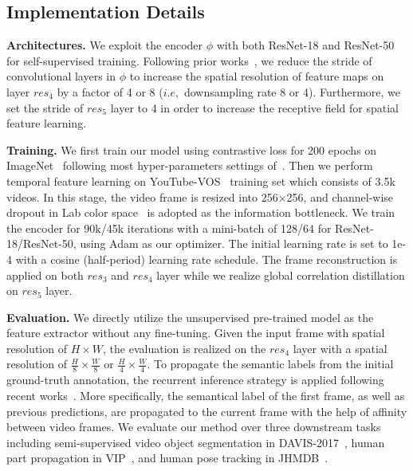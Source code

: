 \documentclass{article}
\begin{document}
\subsection{Implementation Details}
\textbf{Architectures.} We exploit the encoder $\phi$ with both ResNet-18 and ResNet-50~\cite{he2016deep} for self-supervised training. Following prior works~\cite{jabri2020space}\cite{lai2020mast}\cite{xu2021rethinking}, we reduce the stride of convolutional layers in $\phi$ to increase the spatial resolution of feature maps on layer $res_4$  by a factor of 4 or 8 ($i.e,$ downsampling rate 8 or 4). 
Furthermore, we set the stride of $res_5$ layer to 4 in order to increase the receptive field for spatial feature learning.

\textbf{Training.}
We first train our model using contrastive loss for 200 epochs on ImageNet~\cite{deng2009large} following most hyper-parameters settings of~\cite{he2020momentum}. Then we perform temporal feature learning on YouTube-VOS~\cite{xu2018youtube} training set which consists of 3.5k videos. In this stage, the video frame is resized into 256$\times$256, and channel-wise dropout in Lab color space~\cite{lai2019self}\cite{lai2020mast} is adopted as the information bottleneck. We train the encoder for 90k/45k iterations with a mini-batch of 128/64 for ResNet-18/ResNet-50,  using Adam as our optimizer. The initial learning rate is set to 1e-4 with a cosine (half-period) learning rate schedule. The frame reconstruction is applied on both $res_3$ and $res_4$ layer while we realize global correlation distillation on $res_5$ layer.

\textbf{Evaluation.}
 We directly utilize the unsupervised pre-trained model as the feature extractor without any fine-tuning. Given the input frame with  spatial resolution of $H\times W$, the evaluation is realized on the $res_4$ layer with a spatial resolution of $\frac{H}{8} \times \frac{W}{8}$ or $\frac{H}{4} \times \frac{W}{4}$. To propagate the semantic labels from the initial ground-truth annotation, the recurrent inference strategy is applied following recent works~\cite{jabri2020space}\cite{lai2020mast}\cite{xu2021rethinking}. More specifically,  the semantical label of the first frame, as well as previous predictions, are propagated to the current frame with the help of affinity between video frames. We evaluate our method over three downstream tasks including semi-supervised video object segmentation in DAVIS-2017~\cite{pont20172017}, human part propagation in VIP~\cite{zhou2018adaptive}, and human pose tracking in JHMDB~\cite{jhuang2013towards}.
\end{document}
